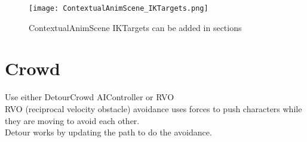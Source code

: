         \begin{figure}
            \texttt{[image: ContextualAnimScene\_IKTargets.png]}
            \caption{ContextualAnimScene IKTargets can be added in sections}
            \label{}
        \end{figure}

    \section{Crowd}
        Use either DetourCrowd AIController or RVO \\
        RVO (reciprocal velocity obstacle) avoidance uses forces to push characters while they are moving to avoid each other. \\
        Detour works by updating the path to do the avoidance. \\